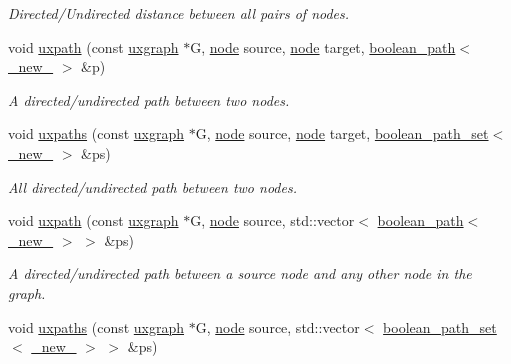 \begin{DoxyCompactItemize}
\begin{DoxyCompactList}\small\item\em Directed/\+Undirected distance between all pairs of nodes. \end{DoxyCompactList}\item 
void \hyperlink{namespacelgraph_1_1traversal_a5873d9c87596daa9002ee537e1ac0252}{uxpath} (const \hyperlink{classlgraph_1_1uxgraph}{uxgraph} $\ast$G, \hyperlink{namespacelgraph_a397169dd66adf725210a30fb7251773e}{node} source, \hyperlink{namespacelgraph_a397169dd66adf725210a30fb7251773e}{node} target, \hyperlink{classlgraph_1_1boolean__path}{boolean\+\_\+path}$<$ \hyperlink{namespacelgraph_aa930092705699c3af78e3a4de7880a3f}{\+\_\+new\+\_\+} $>$ \&p)
\begin{DoxyCompactList}\small\item\em A directed/undirected path between two nodes. \end{DoxyCompactList}\item 
void \hyperlink{namespacelgraph_1_1traversal_a7421bd43fdc27c34609cb21b6ca99f84}{uxpaths} (const \hyperlink{classlgraph_1_1uxgraph}{uxgraph} $\ast$G, \hyperlink{namespacelgraph_a397169dd66adf725210a30fb7251773e}{node} source, \hyperlink{namespacelgraph_a397169dd66adf725210a30fb7251773e}{node} target, \hyperlink{namespacelgraph_afad432931ba600ab1628d5c9595986c5}{boolean\+\_\+path\+\_\+set}$<$ \hyperlink{namespacelgraph_aa930092705699c3af78e3a4de7880a3f}{\+\_\+new\+\_\+} $>$ \&ps)
\begin{DoxyCompactList}\small\item\em All directed/undirected path between two nodes. \end{DoxyCompactList}\item 
void \hyperlink{namespacelgraph_1_1traversal_a3a4182e7eb9e55c497118ba6c79d0b2d}{uxpath} (const \hyperlink{classlgraph_1_1uxgraph}{uxgraph} $\ast$G, \hyperlink{namespacelgraph_a397169dd66adf725210a30fb7251773e}{node} source, std\+::vector$<$ \hyperlink{classlgraph_1_1boolean__path}{boolean\+\_\+path}$<$ \hyperlink{namespacelgraph_aa930092705699c3af78e3a4de7880a3f}{\+\_\+new\+\_\+} $>$ $>$ \&ps)
\begin{DoxyCompactList}\small\item\em A directed/undirected path between a source node and any other node in the graph. \end{DoxyCompactList}\item 
void \hyperlink{namespacelgraph_1_1traversal_acac4a7dbf4378142e0d3a58a23716039}{uxpaths} (const \hyperlink{classlgraph_1_1uxgraph}{uxgraph} $\ast$G, \hyperlink{namespacelgraph_a397169dd66adf725210a30fb7251773e}{node} source, std\+::vector$<$ \hyperlink{namespacelgraph_afad432931ba600ab1628d5c9595986c5}{boolean\+\_\+path\+\_\+set}$<$ \hyperlink{namespacelgraph_aa930092705699c3af78e3a4de7880a3f}{\+\_\+new\+\_\+} $>$ $>$ \&ps)

\end{DoxyCompactItemize}
